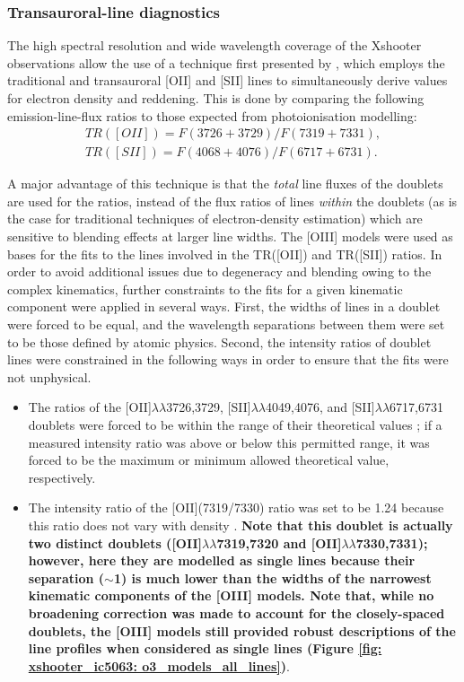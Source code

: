 \subsubsection{Transauroral-line diagnostics}
\label{section: xshooter_ic5063: properties_of_outflowing_gas: uvb_vis_analysis_and_results: transauroral_lines}

The high spectral resolution and wide wavelength coverage of the Xshooter observations allow the use of a technique first presented by \citet{Holt2011}, which employs the traditional and transauroral [OII] and [SII] lines to simultaneously derive values for electron density and reddening. This is done by comparing the following emission-line-flux ratios to those expected from photoionisation modelling:
\begin{align*}
TR([OII]) = F(3726 + 3729) / F(7319 + 7331), \\
TR([SII]) = F(4068 + 4076) / F(6717 + 6731).
\end{align*} 

A major advantage of this technique is that the \textit{total} line fluxes of the doublets are used for the ratios, instead of the flux ratios of lines \textit{within} the doublets (as is the case for traditional techniques of electron-density estimation) which are sensitive to blending effects at larger line widths. The [OIII] models were used as bases for the fits to the lines involved in the TR([OII]) and TR([SII]) ratios. In order to avoid additional issues due to degeneracy and blending owing to the complex kinematics, further constraints to the fits for a given kinematic component were applied in several ways. First, the widths of lines in a doublet were forced to be equal, and the wavelength separations between them were set to be those defined by atomic physics. Second, the intensity ratios of doublet lines were constrained in the following ways in order to ensure that the fits were not unphysical.
\begin{itemize}
	\item The ratios of the [OII]$\lambda\lambda$3726,3729, [SII]$\lambda\lambda$4049,4076, and [SII]$\lambda\lambda$6717,6731 doublets were forced to be within the range of their theoretical values \citep{Osterbrock2006, Rose2018}; if a measured intensity ratio was above or below this permitted range, it was forced to be the maximum or minimum allowed theoretical value, respectively.
	\item The intensity ratio of the [OII](7319/7330) ratio was set to be 1.24 because this ratio does not vary with density \citep{Rose2018}. \textbf{Note that this doublet is actually two distinct doublets ([OII]$\lambda\lambda$7319,7320 and [OII]$\lambda\lambda$7330,7331); however, here they are modelled as single lines because their separation ($\sim$1\;{\AA}) is much lower than the widths of the narrowest kinematic components of the [OIII] models. Note that, while no broadening correction was made to account for the closely-spaced doublets, the [OIII] models still provided robust descriptions of the line profiles when considered as single lines (Figure \ref{fig: xshooter_ic5063: o3_models_all_lines})}.
\end{itemize}

